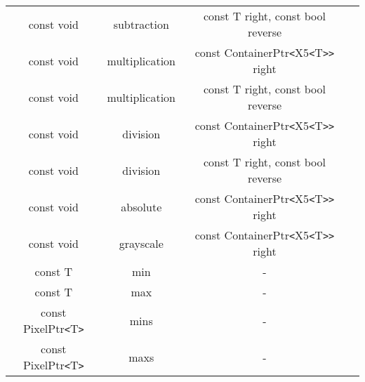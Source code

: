 \documentclass{jsarticle}
\begin{document}
\begin{table}[htb]
\begin{tabular} {|c|c|c|c|}
	const void & subtraction & const T right, const bool reverse \\
	const void & multiplication & const ContainerPtr\verb*|<|X5\verb*|<|T\verb*|>|\verb*|>| right \\
	const void & multiplication & const T right, const bool reverse \\
	const void & division & const ContainerPtr\verb*|<|X5\verb*|<|T\verb*|>|\verb*|>| right \\
	const void & division & const T right, const bool reverse \\
	const void & absolute & const ContainerPtr\verb*|<|X5\verb*|<|T\verb*|>|\verb*|>| right \\
	const void & grayscale & const ContainerPtr\verb*|<|X5\verb*|<|T\verb*|>|\verb*|>| right \\
	const T & min & - \\
	const T & max & - \\
	const PixelPtr\verb*|<|T\verb*|>| & mins & - \\
	const PixelPtr\verb*|<|T\verb*|>| & maxs & - \\ \hline
  \end{tabular}
\end{table}
\end{document}
